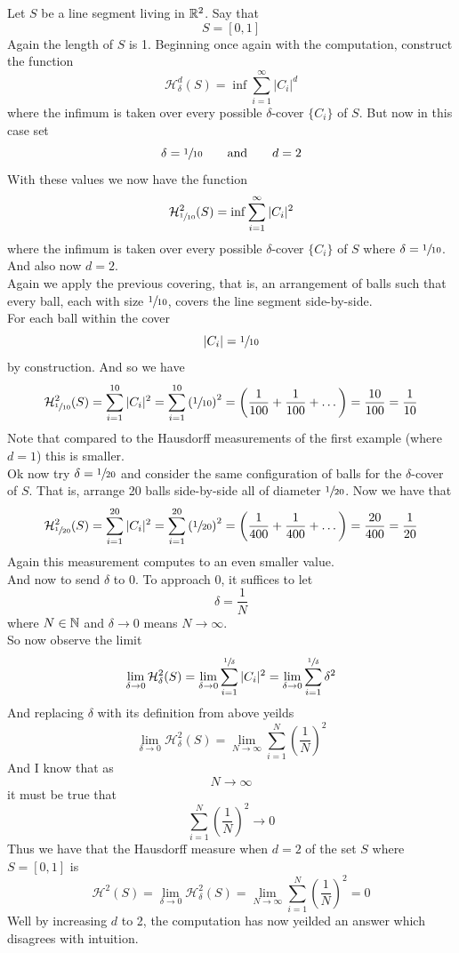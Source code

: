 \documentclass[11pt]{ekblite}
\begin{document}
\begin{example}[Line segment with $d = 2$]
	Let $S$ be a line segment living in $\mathbb{R}^2$. Say that
	\[S = [0,1]\]
	Again the length of $S$ is 1. Beginning once again with the computation, construct the function
	\[\mathcal{H}_{\delta}^d (S) = \inf \sum_{i=1}^{\infty} |C_i|^d\]
	where the infimum is taken over every possible $\delta$-cover $\{C_i\}$ of $S$. But now in this case set
	\[\delta = \sfrac{1}{10} \qquad \text{and} \qquad d = 2\]
	With these values we now have the function
	\[\mathcal{H}_{\sfrac{1}{10}}^{2} (S) = \inf \sum_{i=1}^{\infty} |C_i|^2\]
	where the infimum is taken over every possible $\delta$-cover $\{C_i\}$ of $S$ where $\delta = \sfrac{1}{10}$. And also now $d=2$.
	\\[0.2in]Again we apply the previous covering, that is, an arrangement of balls such that every ball, each with size $\sfrac{1}{10}$, covers the line segment side-by-side.
	\\[0.2in]For each ball within the cover
	\[|C_i| = \sfrac{1}{10}\]
	by construction. And so we have 
	\[\mathcal{H}_{\sfrac{1}{10}}^{2} (S) = \sum_{i=1}^{10} |C_i|^2 = \sum_{i=1}^{10} \left( \sfrac{1}{10} \right)^2 = \left( \frac{1}{100} + \frac{1}{100} + \dots \right) = \frac{10}{100} = \frac{1}{10}\]
	Note that compared to the Hausdorff measurements of the first example (where $d = 1$) this is smaller.
	\\[0.2in]Ok now try $\delta = \sfrac{1}{20}$ and consider the same configuration of balls for the $\delta$-cover of $S$. That is, arrange 20 balls side-by-side all of diameter $\sfrac{1}{20}$. Now we have that
	\[\mathcal{H}_{\sfrac{1}{20}}^{2} (S) = \sum_{i=1}^{20} |C_i|^2 = \sum_{i=1}^{20} \left( \sfrac{1}{20} \right)^2 = \left( \frac{1}{400} + \frac{1}{400} + \dots \right) = \frac{20}{400} = \frac{1}{20}\]
	Again this measurement computes to an even smaller value.
	\\[0.2in]And now to send $\delta$ to 0. To approach 0, it suffices to let
	\[\delta = \frac{1}{N}\]
	where $N \in \mathbb{N}$ and $\delta \rightarrow 0$ means $N \rightarrow \infty$.
	\\[0.2in]So now observe the limit
	\[\lim_{\delta \rightarrow 0} \mathcal{H}_{\delta}^{2} (S) = \lim_{\delta \rightarrow 0} \sum_{i=1}^{\sfrac{1}{\delta}} |C_i|^2 = \lim_{\delta \rightarrow 0} \sum_{i=1}^{\sfrac{1}{\delta}} \delta^2\]
	And replacing $\delta$ with its definition from above yeilds 
	\[\lim_{\delta \rightarrow 0} \mathcal{H}_{\delta}^{2} (S) = \lim_{N \rightarrow \infty} \sum_{i=1}^{N} \left( \frac{1}{N} \right)^2\]
	And I know that as
	\[N \rightarrow \infty\]
	it must be true that
	\[\sum_{i=1}^{N} \left( \frac{1}{N} \right)^2 \rightarrow 0\]
	Thus we have that the Hausdorff measure when $d = 2$ of the set $S$ where $S = [0,1]$ is
	\[\mathcal{H}^2 (S) = \lim_{\delta \rightarrow 0} \mathcal{H}_{\delta}^{2} (S) = \lim_{N \rightarrow \infty} \sum_{i=1}^{N} \left( \frac{1}{N}\right)^2 = 0\]
	Well by increasing $d$ to 2, the computation has now yeilded an answer which disagrees with intuition.
\end{example}
\end{document}
